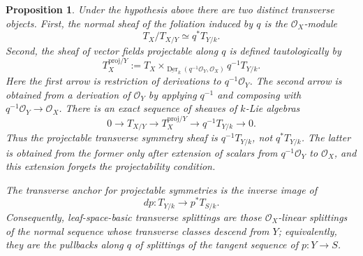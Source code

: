 \documentclass[11pt,reqno,a4paper,dvipsnames,x11names]{amsart}
\numberwithin{equation}{section}
\theoremstyle{plain}
\newtheorem{proposition}[theorem]{Proposition}
\theoremstyle{definition}
\theoremstyle{remark}
\newcommand{\cO}{\mathcal{O}}
\DeclareMathOperator{\Der}{Der}
\newcommand{\kk}{k}
\newcommand{\from}{\colon}
\begin{document}
\begin{proposition}\label{prop:leaf-controller}
Under the hypothesis above there are two distinct transverse objects.
First, the normal sheaf of the foliation induced by \(q\) is the \(\cO_X\)-module
\[
 T_X/T_{X/Y}\simeq q^*T_{Y/\kk}.
\]
Second, the sheaf of vector fields projectable along \(q\) is defined tautologically by
\[
 T_X^{\mathrm{proj}/Y}:=
 T_X\times_{\underline{\Der}_{\kk}(q^{-1}\cO_Y,\cO_X)}q^{-1}T_{Y/\kk}.
\]
Here the first arrow is restriction of derivations to \(q^{-1}\cO_Y\). The second arrow is obtained from a derivation of \(\cO_Y\) by applying \(q^{-1}\) and composing with \(q^{-1}\cO_Y\to\cO_X\). There is an exact sequence of sheaves of \(\kk\)-Lie algebras
\[
 0\longrightarrow T_{X/Y}\longrightarrow T_X^{\mathrm{proj}/Y}
 \longrightarrow q^{-1}T_{Y/\kk}\longrightarrow 0.
\]
Thus the projectable transverse symmetry sheaf is \(q^{-1}T_{Y/\kk}\), not \(q^*T_{Y/\kk}\). The latter is obtained from the former only after extension of scalars from \(q^{-1}\cO_Y\) to \(\cO_X\), and this extension forgets the projectability condition.

The transverse anchor for projectable symmetries is the inverse image of
\[
 dp\from T_{Y/\kk}\longrightarrow p^*T_{S/\kk}.
\]
Consequently, leaf-space-basic transverse splittings are those \(\cO_X\)-linear splittings of the normal sequence whose transverse classes descend from \(Y\); equivalently, they are the pullbacks along \(q\) of splittings of the tangent sequence of \(p\from Y\to S\).
\end{proposition}
\end{document}
